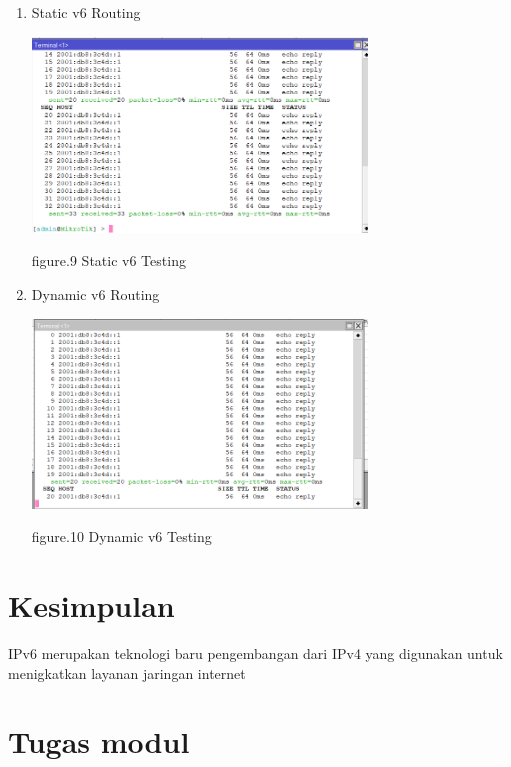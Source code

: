 \begin{enumerate}
    \item Static v6 Routing
    
    \begin{center}
        \includegraphics[width=0.7\textwidth]{image/P5/static/static-test.png}    
        
        figure.9 Static v6 Testing
    \end{center}

    \item Dynamic v6 Routing
    
    \begin{center}
        \includegraphics[width=0.7\textwidth]{image/P5/dynamic/dynamic-test.png}    
        
        figure.10 Dynamic v6 Testing
    \end{center}

\end{enumerate}

\section{Kesimpulan}

IPv6 merupakan teknologi baru pengembangan dari IPv4 yang digunakan untuk menigkatkan layanan jaringan internet 

\section{Tugas modul}


